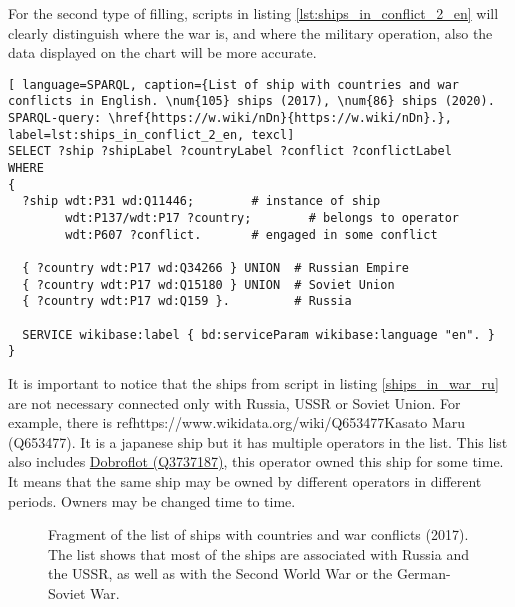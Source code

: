 
For the second type of filling, scripts in listing \ref{lst:ships_in_conflict_2_en} will clearly distinguish where the war is, and where the military operation, also the data displayed on the chart will be more accurate.

\begin{lstlisting}[ language=SPARQL, caption={List of ship with countries and war conflicts in English. \num{105} ships (2017), \num{86} ships (2020). SPARQL-query: \href{https://w.wiki/nDn}{https://w.wiki/nDn}.}, label=lst:ships_in_conflict_2_en, texcl]
SELECT ?ship ?shipLabel ?countryLabel ?conflict ?conflictLabel
WHERE
{
  ?ship wdt:P31 wd:Q11446;        # instance of ship
        wdt:P137/wdt:P17 ?country;        # belongs to operator
        wdt:P607 ?conflict.       # engaged in some conflict
      
  { ?country wdt:P17 wd:Q34266 } UNION  # Russian Empire
  { ?country wdt:P17 wd:Q15180 } UNION  # Soviet Union
  { ?country wdt:P17 wd:Q159 }.         # Russia
      
  SERVICE wikibase:label { bd:serviceParam wikibase:language "en". }
}
\end{lstlisting}

It is important to notice that the ships from script in listing \ref{ships_in_war_ru} are not necessary connected only with Russia, USSR or Soviet Union.
For example, there is ref{https://www.wikidata.org/wiki/Q653477}{Kasato Maru (Q653477)}. It is a japanese ship but it has multiple operators in the list. This list also includes \href{https://www.wikidata.org/wiki/Q3737187}{Dobroflot (Q3737187)}, this operator owned this ship for some time. It means that the same ship may be owned by different operators in different periods. Owners may be changed time to time.


\begin{figure*}[ht]
  {
  \setlength{\fboxsep}{0pt}%
  \setlength{\fboxrule}{1pt}%
  }
    \caption[List of ships with countries and war conflicts]{Fragment of the list of ships with countries and war conflicts (2017). The list shows that most of the ships are associated with Russia and the USSR, as well as with the Second World War or the German-Soviet War.}%
    \label{fig:ships_by_country_and_conflict}%
\end{figure*}